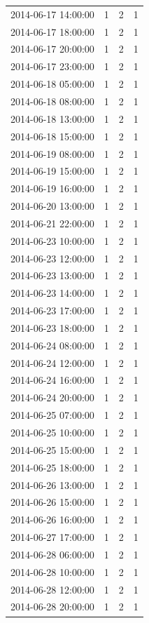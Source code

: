 \begin{tabular}{lrrr}
2014-06-17 14:00:00 & 1 & 2 & 1 \\
2014-06-17 18:00:00 & 1 & 2 & 1 \\
2014-06-17 20:00:00 & 1 & 2 & 1 \\
2014-06-17 23:00:00 & 1 & 2 & 1 \\
2014-06-18 05:00:00 & 1 & 2 & 1 \\
2014-06-18 08:00:00 & 1 & 2 & 1 \\
2014-06-18 13:00:00 & 1 & 2 & 1 \\
2014-06-18 15:00:00 & 1 & 2 & 1 \\
2014-06-19 08:00:00 & 1 & 2 & 1 \\
2014-06-19 15:00:00 & 1 & 2 & 1 \\
2014-06-19 16:00:00 & 1 & 2 & 1 \\
2014-06-20 13:00:00 & 1 & 2 & 1 \\
2014-06-21 22:00:00 & 1 & 2 & 1 \\
2014-06-23 10:00:00 & 1 & 2 & 1 \\
2014-06-23 12:00:00 & 1 & 2 & 1 \\
2014-06-23 13:00:00 & 1 & 2 & 1 \\
2014-06-23 14:00:00 & 1 & 2 & 1 \\
2014-06-23 17:00:00 & 1 & 2 & 1 \\
2014-06-23 18:00:00 & 1 & 2 & 1 \\
2014-06-24 08:00:00 & 1 & 2 & 1 \\
2014-06-24 12:00:00 & 1 & 2 & 1 \\
2014-06-24 16:00:00 & 1 & 2 & 1 \\
2014-06-24 20:00:00 & 1 & 2 & 1 \\
2014-06-25 07:00:00 & 1 & 2 & 1 \\
2014-06-25 10:00:00 & 1 & 2 & 1 \\
2014-06-25 15:00:00 & 1 & 2 & 1 \\
2014-06-25 18:00:00 & 1 & 2 & 1 \\
2014-06-26 13:00:00 & 1 & 2 & 1 \\
2014-06-26 15:00:00 & 1 & 2 & 1 \\
2014-06-26 16:00:00 & 1 & 2 & 1 \\
2014-06-27 17:00:00 & 1 & 2 & 1 \\
2014-06-28 06:00:00 & 1 & 2 & 1 \\
2014-06-28 10:00:00 & 1 & 2 & 1 \\
2014-06-28 12:00:00 & 1 & 2 & 1 \\
2014-06-28 20:00:00 & 1 & 2 & 1 \\

\end{tabular}
